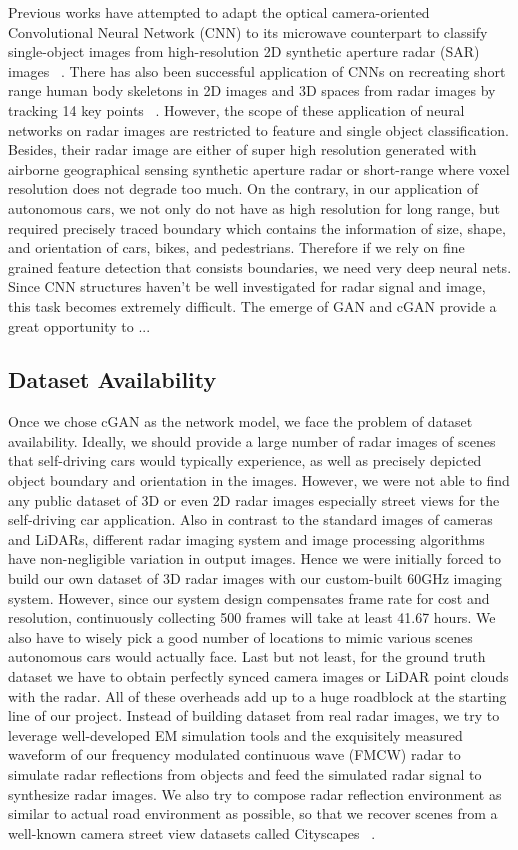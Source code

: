 Previous works have attempted to adapt the optical camera-oriented Convolutional Neural Network (CNN) to its microwave counterpart to classify single-object images from high-resolution 2D synthetic aperture radar (SAR) images ~\cite{SAR_DL, ship_SAR, change_SAR}. There has also been successful application of CNNs on recreating short range human body skeletons in 2D images and 3D spaces from radar images by tracking 14 key points ~\cite{rfpose, rfpose3D}. However, the scope of these application of neural networks on radar images are restricted to feature and single object classification. Besides, their radar image are either of super high resolution generated with airborne geographical sensing synthetic aperture radar or short-range where voxel resolution does not degrade too much. On the contrary, in our application of autonomous cars, we not only do not have as high resolution for long range, but required precisely traced boundary which contains the information of size, shape, and orientation of cars, bikes, and pedestrians. Therefore if we rely on fine grained feature detection that consists boundaries, we need very deep neural nets. Since CNN structures haven't be well investigated for radar signal and image, this task becomes extremely difficult. The emerge of GAN and cGAN provide a great opportunity to ...      

\subsection{Dataset Availability}
Once we chose cGAN as the network model, we face the problem of dataset availability. Ideally, we should provide a large number of radar images of scenes that self-driving cars would typically experience, as well as precisely depicted object boundary and orientation in the images. However, we were not able to find any public dataset of 3D or even 2D radar images especially street views for the self-driving car application. Also in contrast to the standard images of cameras and LiDARs, different radar imaging system and image processing algorithms have non-negligible variation in output images. Hence we were initially forced to build our own dataset of 3D radar images with our custom-built 60GHz imaging system. However, since our system design compensates frame rate for cost and resolution, continuously collecting 500 frames will take at least 41.67 hours. We also have to wisely pick a good number of locations to mimic various scenes autonomous cars would actually face. Last but not least, for the ground truth dataset we have to obtain perfectly synced camera images or LiDAR point clouds with the radar. All of these overheads add up to a huge roadblock at the starting line of our project. Instead of building dataset from real radar images, we try to leverage well-developed EM simulation tools and the exquisitely measured waveform of our frequency modulated continuous wave (FMCW) radar to simulate radar reflections from objects and feed the simulated radar signal to synthesize radar images. We also try to compose radar reflection environment as similar to actual road environment as possible, so that we recover scenes from a well-known camera street view datasets called Cityscapes ~\cite{cityscapes}.   

